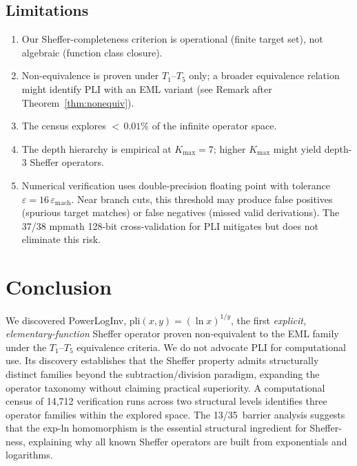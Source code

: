 \documentclass[10pt,twocolumn]{article}
\theoremstyle{remark}
\begin{document}
\subsection*{Limitations}
\begin{enumerate}
\item Our Sheffer-completeness criterion is operational (finite target set), not algebraic (function class closure).
\item Non-equivalence is proven under $T_1$--$T_5$ only; a broader equivalence relation might identify PLI with an EML variant (see Remark after Theorem~\ref{thm:nonequiv}).
\item The census explores ${<}\,0.01\%$ of the infinite operator space.
\item The depth hierarchy is empirical at $K_{\max}{=}7$; higher $K_{\max}$ might yield depth-3 Sheffer operators.
\item Numerical verification uses double-precision floating point with tolerance $\varepsilon = 16\,\varepsilon_{\mathrm{mach}}$. Near branch cuts, this threshold may produce false positives (spurious target matches) or false negatives (missed valid derivations). The 37/38 mpmath 128-bit cross-validation for PLI mitigates but does not eliminate this risk.
\end{enumerate}

\section{Conclusion}

We discovered PowerLogInv, $\mathrm{pli}(x,y) = (\ln x)^{1/y}$, the first \emph{explicit, elementary-function} Sheffer operator proven non-equivalent to the EML family under the $T_1$--$T_5$ equivalence criteria. We do not advocate PLI for computational use. Its discovery establishes that the Sheffer property admits structurally distinct families beyond the subtraction/division paradigm, expanding the operator taxonomy without claiming practical superiority. A computational census of 14{,}712 verification runs across two structural levels identifies three operator families within the explored space. The 13/35~barrier analysis suggests that the exp-ln homomorphism is the essential structural ingredient for Sheffer-ness, explaining why all known Sheffer operators are built from exponentials and logarithms.
\end{document}
